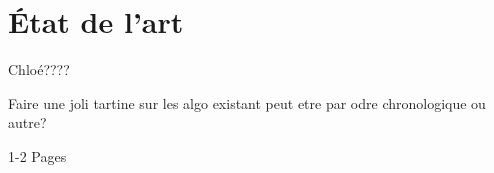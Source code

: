 
\chapter{État de l'art}\label{etat_art}






Chloé????

Faire une joli tartine sur les algo existant peut etre par odre chronologique ou autre?

1-2 Pages